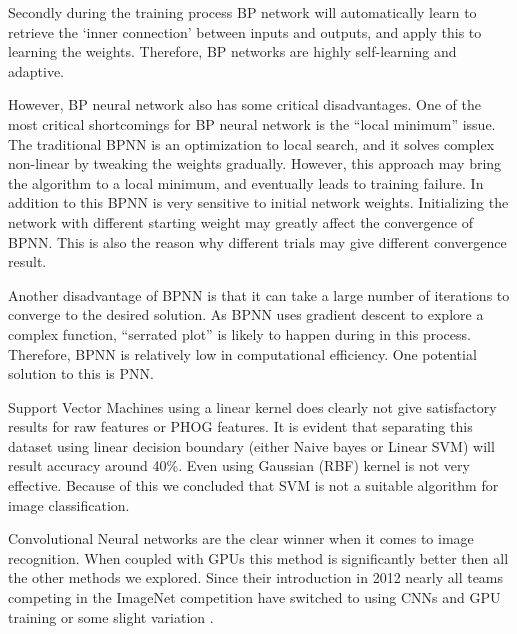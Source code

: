 \documentclass[10pt,twocolumn]{article}
\begin{document}
Secondly during the training process BP network will automatically learn to retrieve the `inner connection' between inputs and outputs, and apply this to learning the weights. Therefore, BP networks are highly self-learning and adaptive.

However, BP neural network also has some critical disadvantages. One of the most critical shortcomings for BP neural network is the “local minimum” issue. The traditional BPNN is an optimization to local search, and it solves complex non-linear by tweaking the weights gradually. However, this approach may bring the algorithm to a local minimum, and eventually leads to training failure. In addition to this BPNN is very sensitive to initial network weights. Initializing the network with different starting weight may greatly affect the convergence of BPNN. This is also the reason why different trials may give different convergence result.

Another disadvantage of BPNN is that it can take a large number of iterations to converge to the desired solution\cite{regression}. As BPNN uses gradient descent to explore a complex function, “serrated plot” is likely to happen during in this process. Therefore, BPNN is relatively low in computational efficiency. One potential solution to this is PNN\cite{prob}\cite{nn}.

Support Vector Machines using a linear kernel does clearly not give satisfactory results for raw features or PHOG features. It is evident that separating this dataset using linear decision boundary (either Naive bayes or Linear SVM) will result accuracy around 40\%. Even using Gaussian (RBF) kernel is not very effective. Because of this we concluded that SVM is not a suitable algorithm for image classification.

Convolutional Neural networks are the clear winner when it comes to image recognition. When coupled with GPUs this method is significantly better then all the other methods we explored. Since their introduction in 2012 nearly all teams competing in the ImageNet competition have switched to using CNNs and GPU training or some slight variation \cite{nvidia}.



\end{document}
